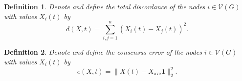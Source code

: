 \documentclass{amsart}
\DeclareMathOperator{\E}{E}
\newtheorem{definition}{Definition}
\theoremstyle{remark}
\begin{document}
\begin{definition}{\label{defn:totalDiscordance}}
	Denote and define the \textit{total discordance} of the nodes $i\in\mathcal{V}(G)$ with values $X_i(t)$ by
\begin{equation*}
	d(X,t)= \sum_{i,j=1}^n(X_i(t)-X_j(t))^2.
\end{equation*}
\end{definition}

\begin{definition}{\label{defn:consensusError}}
	Denote and define the \textit{consensus error} of the nodes $i\in\mathcal{V}(G)$ with values $X_i(t)$ by 
\begin{equation*}
	e(X,t) = \|X(t)-X_{\text{ave}}\mathbf{1}\|^2_2.
\end{equation*}
\end{definition}

%
\end{document}
